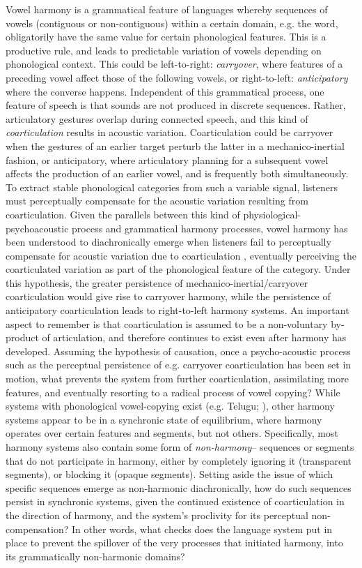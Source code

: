 \documentclass[a4paper,11pt,twocolumn]{article}
\begin{document}
	Vowel harmony is a grammatical feature of languages whereby sequences of vowels (contiguous or non-contiguous) within a certain domain, e.g. the word, obligatorily have the same value for certain phonological features. This is a productive rule, and leads to predictable variation of vowels depending on phonological context. This could be left-to-right: \emph{carryover}, where features of a preceding vowel affect those of the following vowels, or right-to-left: \emph{anticipatory} where the converse happens. Independent of this grammatical process, one feature of speech is that sounds are not produced in discrete sequences. Rather, articulatory gestures overlap during connected speech, and this kind of \emph{coarticulation} results in acoustic variation. Coarticulation could be carryover when the gestures of an earlier target perturb the latter in a mechanico-inertial fashion, or anticipatory, where articulatory planning for a subsequent vowel affects the production of an earlier vowel, and is frequently both simultaneously. To extract stable phonological categories from such a variable signal, listeners must perceptually compensate for the acoustic variation resulting from coarticulation. Given the parallels between this kind of physiological-psychoacoustic process and grammatical harmony processes, vowel harmony has been understood to diachronically emerge when listeners fail to perceptually compensate for acoustic variation due to coarticulation \cite{ohala1994,beddor2002}, eventually perceiving the coarticulated variation as part of the phonological feature of the category. Under this hypothesis, the greater persistence of mechanico-inertial/carryover coarticulation would give rise to carryover harmony, while the persistence of anticipatory coarticulation leads to right-to-left harmony systems. An important aspect to remember is that coarticulation is assumed to be a non-voluntary by-product of articulation, and therefore continues to exist even after harmony has developed. Assuming the hypothesis of causation, once a psycho-acoustic process such as the perceptual persistence of e.g. carryover coarticulation has been set in motion, what prevents the system from further coarticulation, assimilating more features, and eventually resorting to a radical process of vowel copying? While systems with phonological vowel-copying exist (e.g. Telugu; \cite{dutta2016}), other harmony systems appear to be in a synchronic state of equilibrium, where harmony operates over certain features and segments, but not others. Specifically, most harmony systems also contain some form of \emph{non-harmony}-- sequences or segments that do not participate in harmony, either by completely ignoring it (transparent segments), or blocking it (opaque segments). Setting aside the issue of which specific sequences emerge as non-harmonic diachronically, how do such sequences persist in synchronic systems, given the continued existence of coarticulation in the direction of harmony, and the system's proclivity for its perceptual non-compensation? In other words, what checks does the language system put in place to prevent the spillover of the very processes that initiated harmony, into its grammatically non-harmonic domains?
	
\end{document}
